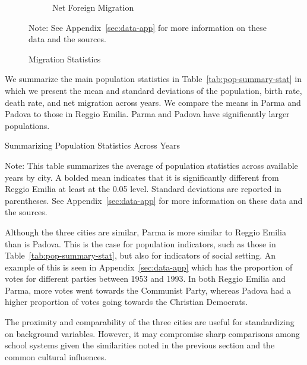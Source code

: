 \begin{figure}[H]
\begin{center}
\begin{subfigure}[ht]{0.48\textwidth}
        \caption{Net Foreign Migration}
        \end{subfigure}
      \caption{Migration Statistics}  \label{fig:emigr-immigr}
      \end{center}
         \raggedright  Note: See Appendix~\ref{sec:data-app} for more information on these data and the sources.
    \end{figure}

    We summarize the main population statistics in Table~\ref{tab:pop-summary-stat} in which we present the mean and standard deviations of the population, birth rate, death rate, and net migration across years. We compare the means in Parma and Padova to those in Reggio Emilia. Parma and Padova have significantly larger populations. 
    
    \begin{table}[H]
    \centering
    \caption{Summarizing Population Statistics Across Years} \label{tab:pop-summary-stat}
    \begin{threeparttable}
	
	
\begin{tablenotes}
\item \footnotesize Note: This table summarizes the average of population statistics across available years by city. A bolded mean indicates that it is significantly different from Reggio Emilia at least at the 0.05 level. Standard deviations are reported in parentheses. See Appendix~\ref{sec:data-app} for more information on these data and the sources.
\end{tablenotes}
\end{threeparttable}
\end{table}

Although the three cities are similar, Parma is more similar to Reggio Emilia than is Padova. This is the case for population indicators, such as those in Table~\ref{tab:pop-summary-stat}, but also for indicators of social setting. An example of this is seen in Appendix~\ref{sec:data-app} which has the proportion of votes for different parties between 1953 and 1993. In both Reggio Emilia and Parma, more votes went towards the Communist Party, whereas Padova had a higher proportion of votes going towards the Christian Democrats. 

The proximity and comparability of the three cities are useful for standardizing on background variables. However, it may compromise sharp comparisons among school systems given the similarities noted in the previous section and the common cultural influences. 
	
